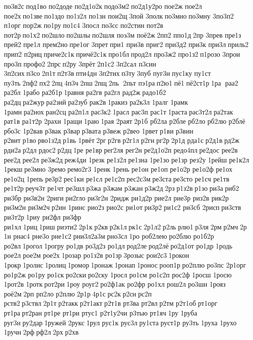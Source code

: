 по3в2с под1во 
по2доде 
по2д1о2к подо3м2 по2д1у2ро 	пое2ж 	пое2л 	пое2х по1зве по1здо 
по1з2л 	по1зн 	пои2щ 3пой 	3полк по3мно по3мну 	3по3п2 	п1орг 	пор2ж 	по1ру по1с4 	3посл 	по3сс 
по2стин 	пот2в 	пот2р по1х2 по2шло по2шлы по2шля 	поэ3м 	поё2ж 2пп2 	ппо1д 2пр  	3прев 	пре1з 	прей2 	пре1л 
прем2но пре1ог 	3прет при1 	при3в 	приг2 
при3д2 	при3к 	при3л приль2 	прип2 	п2риц приче2с1к причё2с1к про1бл прод2л 
про3ж2 
про1з2 п1розо 	3прои 	про3п профо2 2прс п2ру 	3прёт 2п1с2 
3п2сал 	п3син 
3п2сих п3со 2п1т п2т3в пти4дн 
3п2тих п3ту 3пуб 	пуг3н пус1ку 	пу1ст 	пу3ть 2пф2 пх2 2пц 4п3ч 2пш 2пщ 2пь  2пьт 	пэ1ра п2ю1 пё1 пё2ст1р 1ра  раа2 	ра2бл 	1рабо 
ра2б1р 1равня 	ра2гв 	ра2гл 	рад2ж радо1б2 	ра2дц ра2жур ра2зий ра2зуб 	рак2в 1ракиз 
ра2к3л 	1ралг 	1рамк 	1рамн ра2нох ран2сц 
ра2п1л 
рас3к2 	1расл 	рас3п 	рас1т 1раста рас3т2л ра2так 	рат1в 
ра1т2р 	2рахи 	1ращи 1раю 1рая 	2раят 2р1б 	рб2ла 	р2бле 	рб2ло 	рб2лю 	р2блё 	рбо3с 
1р2вав 	р3вак 	р3вар р3вата 	р3веж 	р2вео 	1рвет р1ви 	р3вин 	р2вит р1во рво1з2д р1вь 	1рвёт 2рг р2гв р2г1л р2гн рг2р 2р1д 	рда1с р2д1в рд2ж 	рди2а р2дл 	рдос2 р2дц 1ре  	ре1вр рег2ля 	рег2н 
ре2д1о2п 
редо4пл ре2дос 	рее2в 	рее2д 	рее2л 
ре3ж2д реж4ди 	1резк 
ре1з2л ре1зна 
1ре1зо 	ре1зр 	рез2у 	1рейш 
ре1к2л 	1рекш ре3мно 	3ремо ремо2г3 	1ренк 	1рень 	ре1он 	ре1оп 
ре1о2р 
ре1о2ф 	ре1ох 
ре1о2ц 	1репь ре3р2 рес1ки 	ре1сл 
ре1с2п рес2с3м ре3ста ре3сто 	ре1сч 	ре1тв 
ре1т2р реуч3т 	ре1чт 	ре3шл р3жа  	р3жам 	р3жан р3ж2д 2рз р1з2в р1зо ри3а риб2 	ри3бр 
ри3в2н 	2риги ри2гло 
ри3г2н 	2ридж 
ри1д2р 	рие2л 	рие3р 	риз2в 	рик2р 
ри3м2н 
ри3м2ч р2ин 	1ринс 	рио2з 	рио2с 	ри1от ри3р2 ри1с2 	ри3сб 	2рисп ри3ств 
ри3т2р 1риу 	ри2фл 	ри3фр 	ри1хл 1риц 1риш риэти2 2р1к р2кв р2к1л рк1с 2р1л2 р2ль рлю1 р3ля 2рм р2мч 2р1н 	рнас4 	рне3о 
рне1с2 рни3л2а3м рно3сл 1ро  
роб2лею ро2блю 
ро1б2р 	ро2вл 1рогол 1рогру 	ро1дв 
ро3д2з 	ро1дл род2ле род2лё ро2д1от 	ро1др 	1родь 	рое2л 	рое2м 	рое2х 1розар 
ро1з2в 	ро1зр 3розыс 
рои2с3 1рокон 	1рокр 1ролис 1ролиц 1ромор 1ронаж 1ронап 1ронос рооп1р ро2плю 	ро3пс 
2р1орг 
ро1р2ж 	ро1ру 	ро1ск ро2ски ро2ску 	1росл 	ро1см 
ро1с2п 	рос2ф 	1росш 	1росю 
1рот2в 	1ротк рот2ри 1роу 	роуг2 ро2ф1ак 	ро2фр 	ро1хл 	рош2л 	ро3шн 	1рояз 	роё2м 2рп 	рп2ло 	р2плю 2р1р 4р1с рс2к р2сн рс2п 	рств2 р3ствл 2р1т р2такк р2т1акт р2т1в 	рт3ва 	рт2вл р2тм 
р2т1об рт1орг 	рт1ра рт2ран 	рт1ре 	рт1ри 	ртус1 
р2т1у2чи 	р3тью 	рт1яч 1ру  	1руба 	руг3н ру2дар 1ружей 	2рукс 1рул 	рус1к 	рус3л ру1ста руст1р 	ру3ть 	1руха 	1рухо 	1ручн 2рф рф2л 2рх р2хв 
